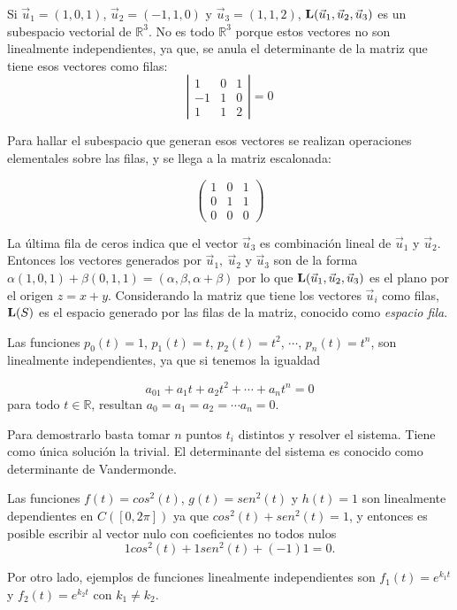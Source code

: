 \begin{example}
\label{ejuis}
Si $\vec{u}_1=(1,0,1)$, $\vec{u}_2=(-1,1,0)$ y $\vec{u}_3=(1,1,2)$,  $\bold{L}(\vec{u}_1,\vec{u}_2,  \vec{u}_3)$ es un subespacio vectorial de $\mathbb{R}^3$. No es todo $\mathbb{R}^3$ porque  estos vectores no son linealmente independientes, ya que,  se anula el determinante de la matriz que tiene esos vectores  como filas:
\[ \left| \begin{array}{ccc}
1 &0 &1\\-1 &1 & 0 \\1&1&2
\end{array}
\right |=0
\]

Para hallar el subespacio que generan  esos vectores se realizan operaciones elementales sobre las filas, y se llega a la matriz escalonada:


\[ \left( \begin{array}{ccc}
1 &0 &1\\0 &1 & 1 \\0 &0 &0 
\end{array}
\right)
\]

\bigskip

La última fila de ceros indica que el vector $\vec{u}_3$ es combinación lineal de $\vec{u}_1$ y $\vec{u}_2$.
Entonces los vectores generados por $\vec{u}_1,~\vec{u}_2$ y  $\vec{u}_3$ son de la forma $\alpha (1,0,1)+ \beta (0,1,1)= ( \alpha, \beta, \alpha + \beta) $ por lo que 
$\bold{L}(\vec{u}_1,\vec{u}_2,  \vec{u}_3)$ es el plano por el origen  $z=x+y$.
Considerando la matriz que tiene los vectores $\vec{u}_i$ como filas, $\bold{L}(S)$ es el espacio generado por las filas de la matriz, conocido como \textit{espacio fila}.
\end{example}

\begin{example}
\label{ejpk}
Las funciones $p_0(t)=1$, $p_1(t)=t$, $p_2(t)=t^2$, $\cdots$, $p_n(t)=t^n$, son linealmente independientes, ya que si tenemos la igualdad

$$a_01+a_1t+a_2t^2  + \cdots + a_nt^n=0$$
para todo $t\in \mathbb{R}$, resultan $a_0=a_1=a_2=\cdots a_n=0$.

Para demostrarlo basta tomar $n$ puntos $t_i$ distintos y resolver el sistema. Tiene como única solución la trivial. El determinante del sistema es conocido como determinante de Vandermonde.
\end{example}




\begin{example}

Las funciones $f(t)=cos^2(t)$,  $g(t)=sen^2(t)$ y $h(t)=1$ son linealmente dependientes en $C(\left[0,2\pi\right])$ ya que $cos^2(t) +sen^2(t)=1$, y entonces es posible escribir al vector nulo con coeficientes no todos nulos $$1 cos^2(t) +1 sen^2(t)+ (-1)1 =0.$$

Por otro lado, ejemplos de funciones linealmente independientes son $f_1(t)= e^{k_1 t}$ y $f_2(t)= e^{k_2 t}$ con $k_1 \neq k_2$.
\end{example}

